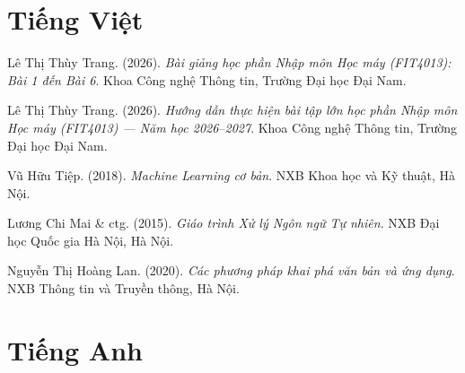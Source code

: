 
\section*{Tiếng Việt}

\begin{enumerate}[label={[\arabic*]}]
    \item Lê Thị Thùy Trang. (2026). \textit{Bài giảng học phần Nhập môn Học máy (FIT4013): Bài 1 đến Bài 6}. Khoa Công nghệ Thông tin, Trường Đại học Đại Nam.
    \item Lê Thị Thùy Trang. (2026). \textit{Hướng dẫn thực hiện bài tập lớn học phần Nhập môn Học máy (FIT4013) --- Năm học 2026--2027}. Khoa Công nghệ Thông tin, Trường Đại học Đại Nam.
    \item Vũ Hữu Tiệp. (2018). \textit{Machine Learning cơ bản}. NXB Khoa học và Kỹ thuật, Hà Nội.
    \item Lương Chi Mai \& ctg. (2015). \textit{Giáo trình Xử lý Ngôn ngữ Tự nhiên}. NXB Đại học Quốc gia Hà Nội, Hà Nội.
    \item Nguyễn Thị Hoàng Lan. (2020). \textit{Các phương pháp khai phá văn bản và ứng dụng}. NXB Thông tin và Truyền thông, Hà Nội.
\end{enumerate}

\section*{Tiếng Anh}

